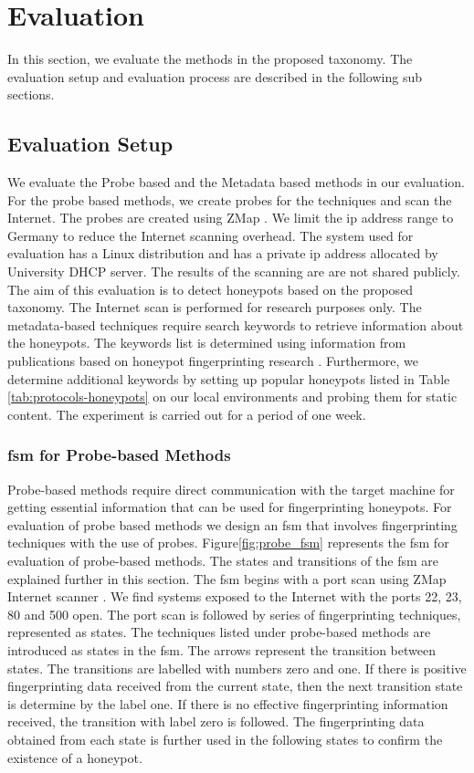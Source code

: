 \section{Evaluation}
\label{sec:eval}

In this section, we evaluate the methods in the proposed taxonomy. The evaluation setup and evaluation process are described in the following sub sections. 

\subsection{Evaluation Setup}
We evaluate the Probe based and the Metadata based methods in our evaluation. For the probe based methods, we create probes for the techniques and scan the Internet. The probes are created using ZMap \cite{zmap}. We limit the \acrshort{ip} address range to Germany to reduce the Internet scanning overhead. The system used for evaluation has a Linux distribution and has a private \acrshort{ip} address allocated by University DHCP server.  The results of the scanning are are not shared publicly. The aim of this evaluation is to detect honeypots based on the proposed taxonomy. The Internet scan is performed for research purposes only. The metadata-based techniques require search keywords to retrieve information about the honeypots. The keywords list is determined using information from publications based on honeypot fingerprinting research \cite{Vetterl2018} \cite{counting}. Furthermore, we determine additional keywords by setting up popular honeypots listed in Table \ref{tab:protocols-honeypots} on our local environments and probing them for static content. The experiment is carried out for a period of one week. 

\subsubsection{\acrshort{fsm} for Probe-based Methods}
Probe-based methods require direct communication with the target machine for getting essential information that can be used for fingerprinting honeypots. For evaluation of probe based methods we design an \acrshort{fsm} that involves fingerprinting techniques with the use of probes. Figure\ref{fig:probe_fsm} represents the \acrshort{fsm} for evaluation of probe-based methods.  The states and transitions of the \acrshort{fsm} are explained further in this section.
The \acrshort{fsm} begins with a port scan using ZMap Internet scanner \cite{zmap}. We find systems exposed to the Internet with the ports 22, 23, 80 and 500 open.  The port scan is followed by series of fingerprinting techniques, represented as states. The techniques listed under probe-based methods are introduced as states in the \acrshort{fsm}. The arrows represent the transition between states. The transitions are labelled with numbers zero and one. If there is positive fingerprinting data received from the current state, then the next transition state is determine by the label one. If there is no effective fingerprinting information received, the transition with label zero is followed. The fingerprinting data obtained from each state is further used in the following states to confirm the existence of a honeypot. 

